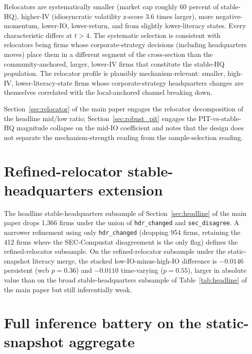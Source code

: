 \documentclass[12pt]{article}
\begin{document}
Relocators are systematically smaller (market cap roughly 60 percent of stable-HQ), higher-IV (idiosyncratic volatility z-score 3.6 times larger), more negative-momentum, lower-IO, lower-return, and from slightly lower-literacy states. Every characteristic differs at $t > 4$. The systematic selection is consistent with relocators being firms whose corporate-strategy decisions (including headquarters moves) place them in a different segment of the cross-section than the community-anchored, larger, lower-IV firms that constitute the stable-HQ population. The relocator profile is plausibly mechanism-relevant: smaller, high-IV, lower-literacy-state firms whose corporate-strategy headquarters changes are themselves correlated with the local-anchored channel breaking down.

Section~\ref{sec:relocator} of the main paper engages the relocator decomposition of the headline mid/low ratio; Section~\ref{sec:robust_pit} engages the PIT-vs-stable-HQ magnitude collapse on the mid-IO coefficient and notes that the design does not separate the mechanism-strength reading from the sample-selection reading.

\section{Refined-relocator stable-headquarters extension}
\label{ia:refinedreloc}

The headline stable-headquarters subsample of Section~\ref{sec:headline} of the main paper drops 1,366 firms under the union of \texttt{hdr\_changed} and \texttt{sec\_disagree}. A narrower refinement using only \texttt{hdr\_changed} (dropping 954 firms, retaining the 412 firms where the SEC-Compustat disagreement is the only flag) defines the refined-relocator subsample. On the refined-relocator subsample under the static-snapshot literacy merge, the stacked low-IO-minus-high-IO difference is $-0.0146$ persistent (wcb $p = 0.36$) and $-0.0110$ time-varying ($p = 0.55$), larger in absolute value than on the broad stable-headquarters subsample of Table~\ref{tab:headline} of the main paper but still inferentially weak.

\section{Full inference battery on the static-snapshot aggregate}
\label{ia:inference}
\end{document}
